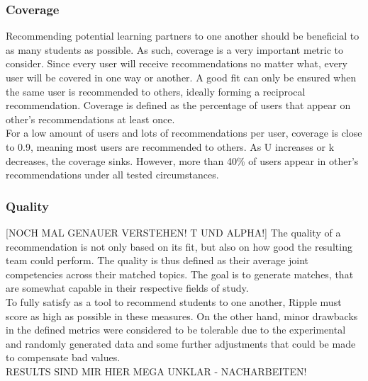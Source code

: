 \documentclass[nochapterpage,bigchapter,linedtoc,longdoc,colorback,accentcolor=tud3b]{tudreport}
\begin{document}
\subsubsection{Coverage} Recommending potential learning partners to one another should be beneficial to as many students as possible. As such, coverage is a very important metric to consider. Since every user will receive recommendations no matter what, every user will be covered in one way or another. A good fit can only be ensured when the same user is recommended to others, ideally forming a reciprocal recommendation. Coverage is defined as the percentage of users that appear on other's recommendations at least once.\\
For a low amount of users and lots of recommendations per user, coverage is close to 0.9, meaning most users are recommended to others. As U increases or k decreases, the coverage sinks. However, more than 40\% of users appear in other's recommendations under all tested circumstances.\\
\subsubsection{Quality} [NOCH MAL GENAUER VERSTEHEN! T UND ALPHA!] The quality of a recommendation is not only based on its fit, but also on how good the resulting team could perform. The quality is thus defined as their average joint competencies across their matched topics. The goal is to generate matches, that are somewhat capable in their respective fields of study.\\
To fully satisfy as a tool to recommend students to one another, Ripple must score as high as possible in these measures. On the other hand, minor drawbacks in the defined metrics were considered to be tolerable due to the experimental and randomly generated data and some further adjustments that could be made to compensate bad values.\\
RESULTS SIND MIR HIER MEGA UNKLAR - NACHARBEITEN!
\end{document}
